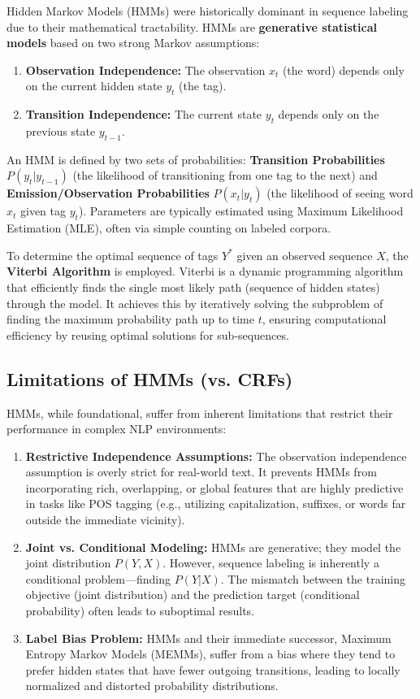 \documentclass{article}
\begin{document}
Hidden Markov Models (HMMs) were historically dominant in sequence labeling due to their mathematical tractability. HMMs are \textbf{generative statistical models} based on two strong Markov assumptions:
\begin{enumerate}
    \item \textbf{Observation Independence:} The observation $x_t$ (the word) depends only on the current hidden state $y_t$ (the tag).
    \item \textbf{Transition Independence:} The current state $y_t$ depends only on the previous state $y_{t-1}$.
\end{enumerate}

An HMM is defined by two sets of probabilities: \textbf{Transition Probabilities} $P(y_t|y_{t-1})$ (the likelihood of transitioning from one tag to the next) and \textbf{Emission/Observation Probabilities} $P(x_t|y_t)$ (the likelihood of seeing word $x_t$ given tag $y_t$). Parameters are typically estimated using Maximum Likelihood Estimation (MLE), often via simple counting on labeled corpora.

To determine the optimal sequence of tags $Y^*$ given an observed sequence $X$, the \textbf{Viterbi Algorithm} is employed. Viterbi is a dynamic programming algorithm that efficiently finds the single most likely path (sequence of hidden states) through the model. It achieves this by iteratively solving the subproblem of finding the maximum probability path up to time $t$, ensuring computational efficiency by reusing optimal solutions for sub-sequences.

\subsection{Limitations of HMMs (vs. CRFs)}

HMMs, while foundational, suffer from inherent limitations that restrict their performance in complex NLP environments:

\begin{enumerate}
    \item \textbf{Restrictive Independence Assumptions:} The observation independence assumption is overly strict for real-world text. It prevents HMMs from incorporating rich, overlapping, or global features that are highly predictive in tasks like POS tagging (e.g., utilizing capitalization, suffixes, or words far outside the immediate vicinity).
    \item \textbf{Joint vs. Conditional Modeling:} HMMs are generative; they model the joint distribution $P(Y, X)$. However, sequence labeling is inherently a conditional problem—finding $P(Y|X)$. The mismatch between the training objective (joint distribution) and the prediction target (conditional probability) often leads to suboptimal results.
    \item \textbf{Label Bias Problem:} HMMs and their immediate successor, Maximum Entropy Markov Models (MEMMs), suffer from a bias where they tend to prefer hidden states that have fewer outgoing transitions, leading to locally normalized and distorted probability distributions.
\end{enumerate}
\end{document}
